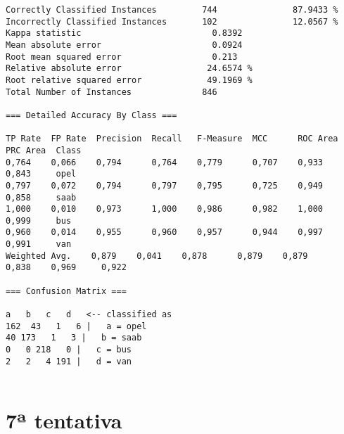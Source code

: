 \documentclass[
	article,			%
	11pt,				%
	oneside,			%
	a4paper,			%
	english,			%
	brazil,				%
	sumario=tradicional
	]{abntex2}
\begin{document}
\begin{lstlisting}
Correctly Classified Instances         744               87.9433 %
Incorrectly Classified Instances       102               12.0567 %
Kappa statistic                          0.8392
Mean absolute error                      0.0924
Root mean squared error                  0.213 
Relative absolute error                 24.6574 %
Root relative squared error             49.1969 %
Total Number of Instances              846     

=== Detailed Accuracy By Class ===

TP Rate  FP Rate  Precision  Recall   F-Measure  MCC      ROC Area  PRC Area  Class
0,764    0,066    0,794      0,764    0,779      0,707    0,933     0,843     opel
0,797    0,072    0,794      0,797    0,795      0,725    0,949     0,858     saab
1,000    0,010    0,973      1,000    0,986      0,982    1,000     0,999     bus
0,960    0,014    0,955      0,960    0,957      0,944    0,997     0,991     van
Weighted Avg.    0,879    0,041    0,878      0,879    0,879      0,838    0,969     0,922     

=== Confusion Matrix ===

a   b   c   d   <-- classified as
162  43   1   6 |   a = opel
40 173   1   3 |   b = saab
0   0 218   0 |   c = bus
2   2   4 191 |   d = van


\end{lstlisting}

\newpage

\section{7ª tentativa}
\end{document}
